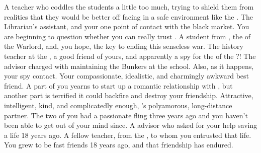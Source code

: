 \documentclass[char]{GL2020}
\begin{document}
\begin{contacts}
    \contact{\cMusic{}} A \pFarm{} teacher who coddles the students a little too much, trying to shield them from realities that they would be better off facing in a safe environment like the \pSc{}.
    \contact{\cLibAssist{}} The Librarian's assistant, and your one point of contact with the black market. You are beginning to question whether you can really trust \cLibAssist{\them}.
    \contact{\cWarlordDaughter{}} A student from \pShip{}, the \cWarlordDaughter{\offspring} of the Warlord, and, you hope, the key to ending this senseless war.
    \contact{\cHistory{}} The history teacher at the \pSc{}, a good friend of yours, and apparently a spy for the \cQueen{\Monarch} of the \pFarm{}?!
    \contact{\cBunker{}} The advisor charged with maintaining the Bunkers at the school. Also, as it happens, your \pShip{} spy contact.
    \contact{\cBeetle{}} Your compassionate, idealistic, and charmingly awkward best friend. A part of you yearns to start up a romantic relationship with \cBeetle{\them}, but another part is terrified it could backfire and destroy your friendship.
    \contact{\cJuniorStatesman{}} Attractive, intelligent, kind, and complicatedly enough, \cBeetle{}'s polyamorous, long-distance partner. The two of you had a passionate fling three years ago and you haven’t been able to get \cJuniorStatesman{\them} out of your mind since.
    \contact{\cEvil{}} A \pFarm{} advisor who asked for your help saving a life 18 years ago.
    \contact{\cPirate{}} A fellow teacher, from the \pShip{}, to whom you entrusted that life. You grew to be fast friends 18 years ago, and that friendship has endured.
\end{contacts}
\end{document}
